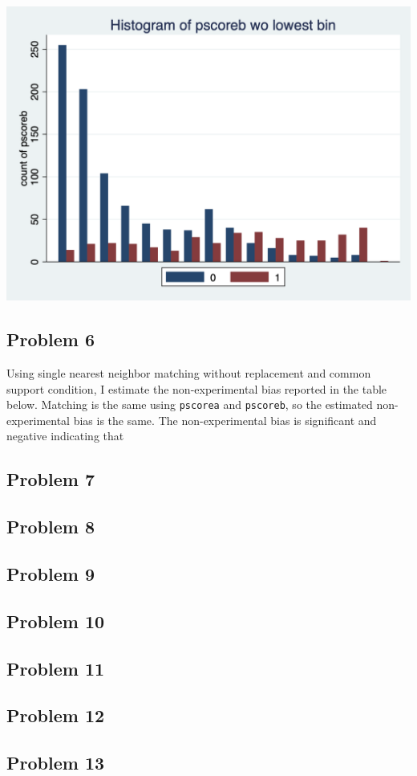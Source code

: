 \documentclass{article}
\begin{document}
\begin{center}
\includegraphics[scale = 0.5]{figure_5b_2}
\end{center}

\pagebreak

\subsection*{Problem 6}

Using single nearest neighbor matching without replacement and common support condition, I estimate the non-experimental bias reported in the table below.  Matching is the same using \texttt{pscorea} and \texttt{pscoreb}, so the estimated non-experimental bias is the same.  The non-experimental bias is significant and negative indicating that 

\begin{center}

\end{center}

\subsection*{Problem 7}
\subsection*{Problem 8}
\subsection*{Problem 9}
\subsection*{Problem 10}
\subsection*{Problem 11}
\subsection*{Problem 12}
\subsection*{Problem 13}

%
\end{document}
